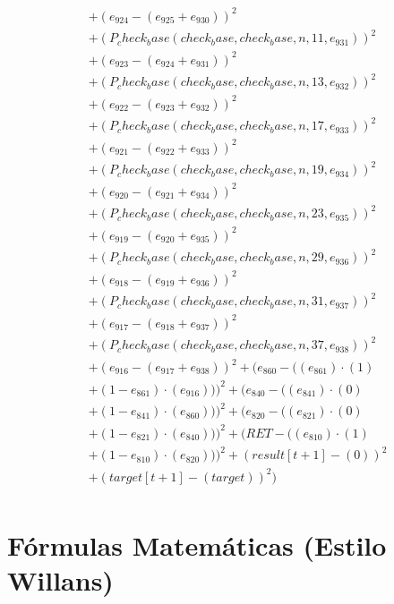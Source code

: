 \documentclass[10pt, a4paper]{article}
\begin{document}
\begin{small}
\begin{align*}
& + (e_{924} - (e_{925} + e_{930}))^{2} \\
& + (P_check_base(check_base, check_base, n, 11, e_{931}))^{2} \\
& + (e_{923} - (e_{924} + e_{931}))^{2} \\
& + (P_check_base(check_base, check_base, n, 13, e_{932}))^{2} \\
& + (e_{922} - (e_{923} + e_{932}))^{2} \\
& + (P_check_base(check_base, check_base, n, 17, e_{933}))^{2} \\
& + (e_{921} - (e_{922} + e_{933}))^{2} \\
& + (P_check_base(check_base, check_base, n, 19, e_{934}))^{2} \\
& + (e_{920} - (e_{921} + e_{934}))^{2} \\
& + (P_check_base(check_base, check_base, n, 23, e_{935}))^{2} \\
& + (e_{919} - (e_{920} + e_{935}))^{2} \\
& + (P_check_base(check_base, check_base, n, 29, e_{936}))^{2} \\
& + (e_{918} - (e_{919} + e_{936}))^{2} \\
& + (P_check_base(check_base, check_base, n, 31, e_{937}))^{2} \\
& + (e_{917} - (e_{918} + e_{937}))^{2} \\
& + (P_check_base(check_base, check_base, n, 37, e_{938}))^{2} \\
& + (e_{916} - (e_{917} + e_{938}))^{2} + (e_{860} - ((e_{861})  \cdot  (1) \\
& + (1 - e_{861})  \cdot  (e_{916})))^{2} + (e_{840} - ((e_{841})  \cdot  (0) \\
& + (1 - e_{841})  \cdot  (e_{860})))^{2} + (e_{820} - ((e_{821})  \cdot  (0) \\
& + (1 - e_{821})  \cdot  (e_{840})))^{2} + (RET - ((e_{810})  \cdot  (1) \\
& + (1 - e_{810})  \cdot  (e_{820})))^{2} + (result[t+1] - (0))^{2} \\
& + (target[t+1] - (target))^{2}) \\
\end{align*}
\end{small}\part{Fórmulas Matemáticas (Estilo Willans)}
\end{document}
